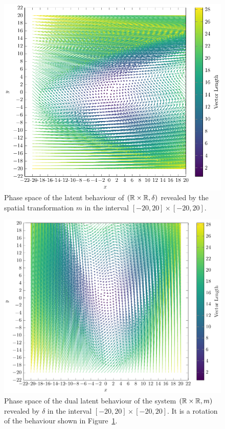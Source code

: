 \begin{figure}[t]
    \centering
    \includegraphics[width=\textwidth]{Figures/VectorSpace4.pdf} 
    \caption{Phase space of the latent behaviour of $(\mathbb{R}\times\mathbb{R}, \delta)$ revealed by the spatial transformation $m$ in the interval $[-20,20]\times[-20,20]$.}
    \label{fig:FirstLatent}
\end{figure} 

\begin{figure}[t] 
    \includegraphics[width=\textwidth]{Figures/VectorSpace3.pdf} 
    \caption{Phase space of the dual latent behaviour of the system $(\mathbb{R}\times\mathbb{R}, m)$ revealed by $\delta$ in the interval $[-20,20]\times[-20,20]$. It is a rotation of the behaviour shown in Figure~\ref{fig:FirstLatent}.}
    \label{fig:SecondLatent} 
  \end{figure}

